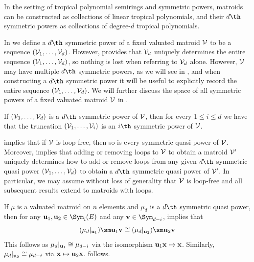 In the setting of tropical polynomial semirings and symmetric powers, matroids can be constructed as collections of linear tropical polynomials, and their $d\th$ symmetric powers as collections of degree-$d$ tropical polynomials.

\begin{remark}
In  we define a $d\th$ symmetric power of a fixed valuated matroid $\mathcal{V}$ to be a sequence $(\mathcal{V}_1,\dots,\mathcal{V}_d)$. However,  provides that $\mathcal{V}_d$ uniquely determines the entire sequence $(\mathcal{V}_1,\dots,\mathcal{V}_d)$, so nothing is lost when referring to $\mathcal{V}_d$ alone. However, $\mathcal{V}$ may have multiple $d\th$ symmetric powers, as we will see in , and when constructing a $d\th$ symmetric power it will be useful to explicitly record the entire sequence $(\mathcal{V}_1,\dots,\mathcal{V}_d)$. We will further discuss the space of all symmetric powers of a fixed valuated matroid $\mathcal{V}$ in .
\end{remark}

\begin{remark}\label{rem:truncation}
If $(\mathcal{V}_1,\dots,\mathcal{V}_d)$ is a $d\th$ symmetric power of $\mathcal{V}$, then for every $1\leq i\leq d$ we have that the truncation $(\mathcal{V}_1,\dots,\mathcal{V}_i)$ is an $i\th$ symmetric power of $\mathcal{V}$.
\end{remark}

\begin{remark}\label{rem:loopless}
 implies that if $\mathcal{V}$ is loop-free, then so is every symmetric quasi power of $\mathcal{V}$. Moreover,  implies that adding or removing loops to $\mathcal{V}$ to obtain a matroid $\mathcal{V}'$ uniquely determines how to add or remove loops from any given $d\th$ symmetric quasi power $(\mathcal{V}_1,\dots,\mathcal{V}_d)$ to obtain a $d\th$ symmetric quasi power of $\mathcal{V}'$. In particular, we may assume without loss of generality that $\mathcal{V}$ is loop-free and all subsequent results extend to matroids with loops.
\end{remark}

\begin{remark}\label{rem:isoMinors}
If $\mu$ is a valuated matroid on $n$ elements and $\mu_d$ is a $d\th$ symmetric quasi power, then for any $\bfu_1, \bfu_2\in \Sym_{i}(E)$ and any $\bfv\in \Sym_{d-i}$,  implies that 
\begin{equation}\label{eqn:isoMinors}
    (\mu_d|_{\bfu_1})\sm \bfu_1\bfv\cong (\mu_d|_{\bfu_2})\sm \bfu_2\bfv
\end{equation}
This follows as $\mu_d|_{\mathbf{u}_1}\cong \mu_{d-i}$ via the isomorphism $\mathbf{u}_1 \mathbf{x}\mapsto \mathbf{x}$. Similarly, $\mu_d|_{\mathbf{u}_2}\cong \mu_{d-i}$ via $\mathbf{x}\mapsto \mathbf{u}_2 \mathbf{x}$.  follows.
\end{remark}

